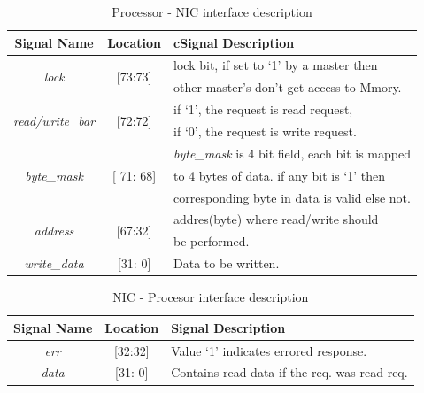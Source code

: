 \documentclass[a4paper,11pt, final]{report}
\begin{document}
				\begin{table}[!htbp]
					\centering
					\begin{tabular}{ccl}
						\hline
						\textbf{Signal Name} 			& \textbf{Location} 		&{c}\textbf{Signal Description}  \\ \hline
						\multirow{2}{*}{\textit{lock}}		& \multirow{2}{*}{[73:73]}	& lock bit, if set to `1' by a master then\\
											&				& other master's don't get access to Mmory.\\ \hline
						\multirow{2}{*}{\textit{read/write\_bar}}& \multirow{2}{*}{[72:72]}	& if `1', the request is read request,\\ 
											& 				& if `0', the request is write request.\\ \hline
						\multirow{3}{*}{\textit{byte\_mask}}	& \multirow{3}{*}{[ 71: 68]}	& \textit{byte\_mask} is 4 bit field, each bit is mapped\\
											&				& to 4 bytes of data. if any bit is `1' then\\
											& 				& corresponding byte in data is valid else not.\\ \hline 
						\multirow{2}{*}{\textit{address}}   	& \multirow{2}{*}{[67:32]} 	& addres(byte) where read/write should\\ 
											&				& be performed.\\ \hline
						\textit{write\_data}   			& [31: 0] 			& Data to be written.\\ \hline
					\end{tabular}
					\caption{Processor - NIC interface description}
					\label{tab:Proc-NIC-interface-req}
				\end{table}

				\begin{table}[!htbp]
					\centering
					\begin{tabular}{ccl}
						\hline
						\textbf{Signal Name} 		& \textbf{Location} 		&\textbf{Signal Description}  \\ \hline
						\textit{err}			& [32:32]			& Value `1' indicates errored response.\\\hline
						\textit{data}   		& [31: 0] 			& Contains read data if the req. was read req.\\ \hline
					\end{tabular}
					\caption{ NIC - Procesor interface description}
					\label{tab:NIC-Proc-interface-resp}
				\end{table}

	
\end{document}
